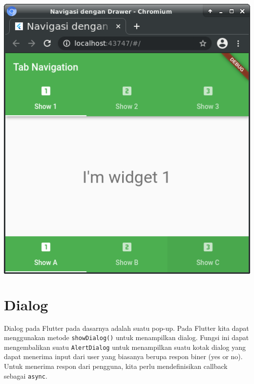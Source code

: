 \documentclass[a4paper,11pt]{article} %
\newcommand{\txtinline}[1]{\texttt{#1}}
\begin{document}
{\center
\includegraphics[scale=0.5]{images/navigation_tab_01.png}
\par}

\section{Dialog}

Dialog pada Flutter pada dasarnya adalah  suatu pop-up.
Pada Flutter kita dapat menggunakan metode \txtinline{showDialog()} untuk menampilkan
dialog. Fungsi ini dapat mengembalikan suatu \txtinline{AlertDialog} untuk menampilkan
suatu kotak dialog yang dapat menerima input dari user yang biasanya berupa respon
biner (yes or no). Untuk menerima respon dari pengguna, kita perlu mendefinisikan
callback sebagai \txtinline{async}.
\end{document}
